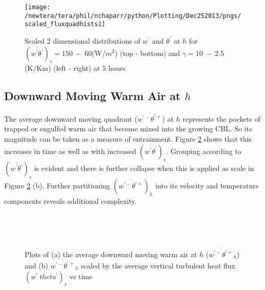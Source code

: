 \begin{figure}[htbp]
\centering
 \texttt{[image: /newtera/tera/phil/nchaparr/python/Plotting/Dec252013/pngs/scaled\_fluxquadhists1]}                 
\caption[Scaled 2D distributions of $w^{'}$ and $\theta^{'}$ for all runs]{Scaled 2 dimensional distributions of $w^{'}$ and $\theta^{'}$ at $h$ for $(\overline{w^{'}\theta^{'}})_{s} = 150 \ - \ 60$(W/$m^{2}$) (top - bottom) and $\gamma = 10 \ - \  2.5$(K/Km) (left - right) at 5 hours}
\label{fig:scaled_fluxquadsh1}
\end{figure}


\clearpage

\subsection{Downward Moving Warm Air at $h$}
\label{subsec:downwarm}

The average downward moving quadrant ($\overline{w^{'-}\theta^{'+}}$) at $h$ represents the pockets of trapped or engulfed warm air that become mixed into the growing \acs{CBL}.  So its magnitude can be taken as a measure of entrainment.  Figure \ref{fig:downwarm} shows that this increases in time as well as with increased $(\overline{w^{'}\theta^{'}})_{s}$.  Grouping according to $(\overline{w^{'}\theta^{'}})_{s}$ is evident and there is further collapse when this is applied as scale in Figure \ref{fig:downwarm} (b).  Further partitioning $(\overline{w^{'-}\theta^{'+}})_{h}$ into its velocity and temperature components reveals additional complexity.\\

\begin{figure}[htbp]
\begin{minipage}[b]{0.5\linewidth}
        \\
        \end{minipage}             
\quad
\begin{minipage}[b]{0.5\linewidth}
        \\
     
       \end{minipage}
        \caption[Downward moving warm air at $h$]{Plots of (a) the average downward moving warm air at $h$ ($\overline{w^{\prime-}\theta^{\prime+}}_{h}$) and (b) $\overline{w^{\prime-}\theta^{\prime+}}_{h}$ scaled by the average vertical turbulent heat flux $ ( \overline{ w^{'}\ theta^{'} } )_{s} $ vs time}
        \label{fig:downwarm}
\end{figure}\\

